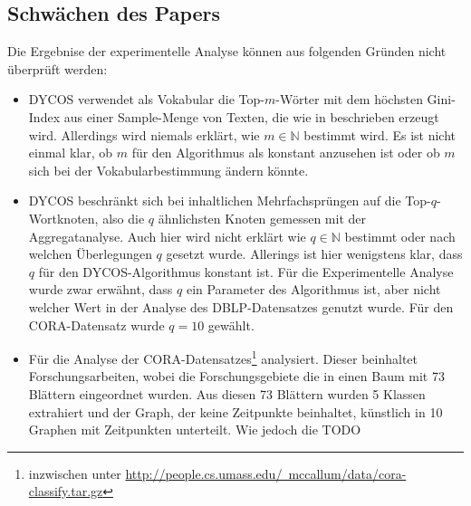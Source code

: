 \subsection{Schwächen des Papers}
Die Ergebnise der experimentelle Analyse können aus folgenden Gründen
nicht überprüft werden:
\begin{itemize}
    \item DYCOS verwendet als Vokabular die Top-$m$-Wörter mit dem
          höchsten Gini-Index aus einer Sample-Menge von Texten, die
          wie in \cite{Vitter} beschrieben
          erzeugt wird. Allerdings wird niemals erklärt, wie $m \in \mathbb{N}$
          bestimmt wird. Es ist nicht einmal klar, ob $m$ für den
          Algorithmus als konstant anzusehen ist oder ob $m$ sich
          bei der Vokabularbestimmung ändern könnte.
    \item DYCOS beschränkt sich bei inhaltlichen Mehrfachsprüngen
          auf die Top-$q$-Wortknoten, also die $q$ ähnlichsten Knoten
          gemessen mit der Aggregatanalyse. Auch hier wird nicht erklärt wie
          $q \in \mathbb{N}$ bestimmt oder nach welchen Überlegungen $q$ gesetzt 
          wurde. Allerings ist hier wenigstens klar, dass $q$ für
          den DYCOS-Algorithmus konstant ist. Für die Experimentelle
          Analyse wurde zwar erwähnt, dass $q$ ein Parameter des
          Algorithmus ist\cite[S. 362]{aggarwal2011}, aber nicht welcher
          Wert in der Analyse des DBLP-Datensatzes genutzt wurde.
          Für den CORA-Datensatz wurde $q=10$ gewählt\cite[S. 364]{aggarwal2011}.
    \item Für die Analyse der CORA-Datensatzes\footnote{inzwischen unter \href{http://people.cs.umass.edu/~mccallum/data/cora-classify.tar.gz}{http://people.cs.umass.edu/~mccallum/data/cora-classify.tar.gz}} analysiert.
          Dieser beinhaltet Forschungsarbeiten, wobei die 
          Forschungsgebiete die in einen Baum mit 73 Blättern 
          eingeordnet wurden. Aus diesen 73 Blättern wurden 5 Klassen
          extrahiert und der Graph, der keine Zeitpunkte beinhaltet,
          künstlich in 10 Graphen mit Zeitpunkten unterteilt. Wie
          jedoch die TODO
\end{itemize}
